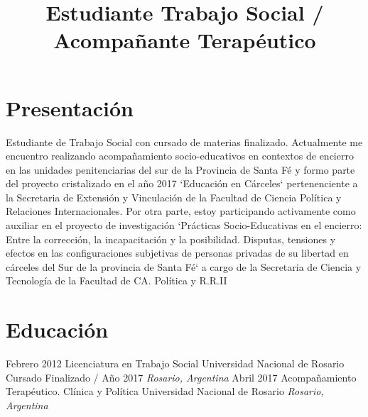 \documentclass[11pt,a4paper,sans]{moderncv}        %
\title{Estudiante Trabajo Social / Acompañante Terap\'eutico}                               %
\begin{document}
\makecvtitle

\section{Presentación}
Estudiante de Trabajo Social con cursado de materias finalizado. Actualmente me encuentro realizando acompañamiento socio-educativos en contextos de encierro en las unidades penitenciarias del sur de la Provincia de Santa F\'e y formo parte del proyecto cristalizado en el año 2017 `Educación en Cárceles` pertenenciente a la Secretaria de Extensi\'on y Vinculación de la Facultad de Ciencia Pol\'itica y Relaciones Internacionales. Por otra parte, estoy participando activamente como auxiliar en el proyecto de investigaci\'on `Pr\'acticas Socio-Educativas en el encierro: Entre la correcci\'on, la incapacitación y la posibilidad. Disputas, tensiones y efectos en las configuraciones subjetivas de personas privadas de su libertad en cárceles del Sur de la provincia de Santa F\'e` a cargo de la Secretaria de Ciencia y Tecnología de la Facultad de CA. Política y R.R.II
\vspace{2mm}

\section{Educación}
\cventry
{Febrero 2012}
{Licenciatura en Trabajo Social}
{Universidad Nacional de Rosario} 
{Cursado Finalizado / Año 2017} 
{}
{\textit{Rosario, Argentina}}
{}
\cventry
{Abril 2017}
{Acompañamiento Terap\'eutico. Clínica y Política}
{Universidad Nacional de Rosario}
{}
{\textit{Rosario, Argentina}}
{}
\vspace{2mm}
\end{document}

